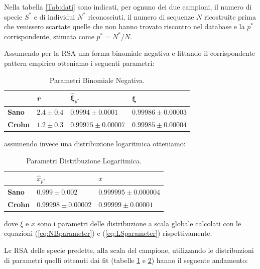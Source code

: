 Nella tabella \ref{Tab:dati} sono indicati, per ognuno dei due campioni, il numero di specie $S^*$ e di individui $N^*$ riconosciuti, il numero di sequenze $N$ ricostruite prima che venissero scartate quelle che non hanno trovato riscontro nel database e la $p^*$ corrispondente, stimata come $p^*=N^*/N$.


Assumendo per la RSA una forma binomiale negativa e fittando il corrispondente pattern empirico otteniamo i seguenti parametri:


\begin{table}[H]
\centering
\begin{tabular}{l|l|l|l|}
\cline{2-4}
                                     & \textit{r}    & $\mathbf{\hat \xi}_{p^*}$                & $\mathbf{\xi}$             \\ \hline
\multicolumn{1}{|l|}{\textbf{Sano}}  & $2.4 \pm 0.4$ & $0.9994 \pm 0.0001$ & $0.99986 \pm0.00003 $ \\ \hline
\multicolumn{1}{|l|}{\textbf{Crohn}} & $1.2 \pm 0.3$ & $0.99975 \pm0.00007 $     & $0.99985 \pm0.00004 $ \\ \hline
\end{tabular}
\caption{Parametri Binomiale Negativa.}
\label{Tab:parametriNB}
\end{table}

assumendo invece una distribuzione logaritmica otteniamo:

\begin{table}[H]
\centering
\begin{tabular}{l|l|l|}
\cline{2-3}
                                     & $\hat x_{p^*}$                    & $x$ \\ \hline
\multicolumn{1}{|l|}{\textbf{Sano}}  & $0.999 \pm 0.002$     & $ 0.999995 \pm 0.000004$ \\ \hline
\multicolumn{1}{|l|}{\textbf{Crohn}} & $0.99998 \pm 0.00002$ & $ 0.99999 \pm0.00001$  \\ \hline
\end{tabular}
\caption{Parametri Distribuzione Logaritmica.}
\label{Tab:parametriLS}
\end{table}

dove $\xi$ e $x$ sono i parametri delle distribuzione a scala globale calcolati con le equazioni (\ref{eq:NBparameter}) e (\ref{eq:LSparameter}) rispettivamente.

Le RSA delle specie predette, alla scala del campione, utilizzando le distribuzioni di parametri quelli ottenuti dai fit (tabelle \ref{Tab:parametriNB} e \ref{Tab:parametriLS}) hanno il seguente andamento:

